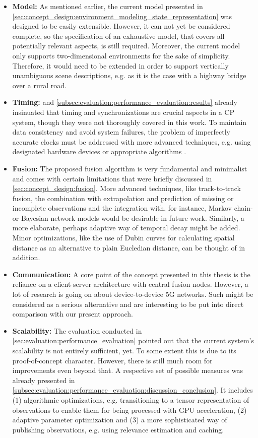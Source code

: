 \begin{itemize}
	\item \textbf{Model:} As mentioned earlier, the current model presented in \cref{sec:concept_design:environment_modeling_state_representation} was designed to be easily extensible. However, it can not yet be considered complete, so the specification of an exhaustive model, that covers all potentially relevant aspects, is still required. Moreover, the current model only supports two-dimensional environments for the sake of simplicity. Therefore, it would need to be extended in order to support vertically unambiguous scene descriptions, e.g. as it is the case with a highway bridge over a rural road. 
	\item \textbf{Timing:}  and \cref{subsec:evaluation:performance_evaluation:results} already insinuated that timing and synchronizations are crucial aspects in a CP system, though they were not thoroughly covered in this work. To maintain data consistency and avoid system failures, the problem of imperfectly accurate clocks must be addressed with more advanced techniques, e.g. using designated hardware devices \cite{Rauch2011} or appropriate algorithms \cite{Julier}. 
	\item \textbf{Fusion:} The proposed fusion algorithm is very fundamental and minimalist and comes with certain limitations that were briefly discussed in \cref{sec:concept_design:fusion}. More advanced techniques, like track-to-track fusion, the combination with extrapolation and prediction of missing or incomplete observations and the integration with, for instance, Markov chain- or Bayesian network models would be desirable in future work. Similarly, a more elaborate, perhaps adaptive way of temporal decay might be added. Minor optimizations, like the use of Dubin curves for calculating spatial distance as an alternative to plain Eucledian distance, can be thought of in addition. 
	\item \textbf{Communication:} A core point of the concept presented in this thesis is the reliance on a client-server architecture with central fusion nodes. However, a lot of research is going on about device-to-device 5G networks. Such might be considered as a serious alternative and are interesting to be put into direct comparison with our present approach. 
	\item \textbf{Scalability:} The evaluation conducted in \cref{sec:evaluation:performance_evaluation} pointed out that the current system's scalability is not entirely sufficient, yet. To some extent this is due to its proof-of-concept character. However, there is still much room for improvements even beyond that. A respective set of possible measures was already presented in \cref{subsec:evaluation:performance_evaluation:discussion_conclusion}. It includes (1) algorithmic optimizations, e.g. transitioning to a tensor representation of observations to enable them for being processed with GPU acceleration, (2) adaptive parameter optimization and (3) a more sophisticated way of publishing observations, e.g. using relevance estimation \cite{Breu2013} and caching. 

\end{itemize}
